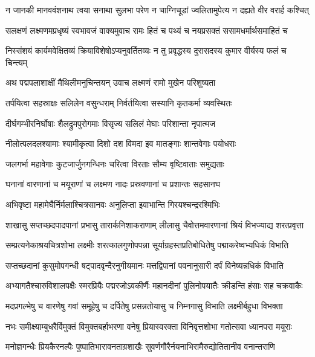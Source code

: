 \twolineshloka
{न जानकी मानववंशनाथ त्वया सनाथा सुलभा परेण}
{न चाग्निचूडां ज्वलितामुपेत्य न दह्यते वीर वरार्ह कश्चित्} %

\twolineshloka
{सलक्षणं लक्ष्मणमप्रधृष्यं स्वभावजं वाक्यमुवाच रामः}
{हितं च पथ्यं च नयप्रसक्तं ससामधर्मार्थसमाहितं च} %

\twolineshloka
{निस्संशयं कार्यमवेक्षितव्यं क्रियाविशेषोऽप्यनुवर्तितव्यः}
{न तु प्रवृद्धस्य दुरासदस्य कुमार वीर्यस्य फलं च चिन्त्यम्} %

\twolineshloka
{अथ पद्मपलाशाक्षीं मैथिलीमनुचिन्तयन्}
{उवाच लक्ष्मणं रामो मुखेन परिशुष्यता} %

\twolineshloka
{तर्पयित्वा सहस्राक्षः सलिलेन वसुन्धराम्}
{निर्वर्तयित्वा सस्यानि कृतकर्मा व्यवस्थितः} %

\twolineshloka
{दीर्घगम्भीरनिर्घोषाः शैलद्रुमपुरोगमाः}
{विसृज्य सलिलं मेघाः परिशान्ता नृपात्मज} %

\twolineshloka
{नीलोत्पलदलश्यामाः श्यामीकृत्वा दिशो दश}
{विमदा इव मातङ्गाः शान्तवेगाः पयोधराः} %

\twolineshloka
{जलगर्भा महावेगाः कुटजार्जुनगन्धिनः}
{चरित्वा विरताः सौम्य वृष्टिवाताः समुद्यताः} %

\twolineshloka
{घनानां वारणानां च मयूराणां च लक्ष्मण}
{नादः प्रस्रवणानां च प्रशान्तः सहसानघ} %

\twolineshloka
{अभिवृष्टा महामेघैर्निर्मलाश्चित्रसानवः}
{अनुलिप्ता इवाभान्ति गिरयश्चन्द्ररश्मिभिः} %

\twolineshloka
{शाखासु सप्तच्छदपादपानां प्रभासु तारार्कनिशाकराणाम्}
{लीलासु चैवोत्तमवारणानां श्रियं विभज्याद्य शरत्प्रवृत्ता} %

\twolineshloka
{सम्प्रत्यनेकाश्रयचित्रशोभा लक्ष्मीः शरत्कालगुणोपपन्ना}
{सूर्याग्रहस्तप्रतिबोधितेषु पद्माकरेष्वभ्यधिकं विभाति} %

\twolineshloka
{सप्तच्छदानां कुसुमोपगन्धी षट्पादवृन्दैरनुगीयमानः}
{मत्तद्विपानां पवनानुसारी दर्पं विनेष्यन्नधिकं विभाति} %

\twolineshloka
{अभ्यागतैश्चारुविशालपक्षैः स्मरप्रियैः पद्मरजोऽवकीर्णैः}
{महानदीनां पुलिनोपयातैः क्रीडन्ति हंसाः सह चक्रवाकैः} %

\twolineshloka
{मदप्रगल्भेषु च वारणेषु गवां समूहेषु च दर्पितेषु}
{प्रसन्नतोयासु च निम्नगासु विभाति लक्ष्मीर्बहुधा विभक्ता} %

\twolineshloka
{नभः समीक्ष्याम्बुधरैर्विमुक्तं विमुक्तबर्हाभरणा वनेषु}
{प्रियास्वरक्ता विनिवृत्तशोभा गतोत्सवा ध्यानपरा मयूराः} %

\twolineshloka
{मनोज्ञगन्धैः प्रियकैरनल्पैः पुष्पातिभारावनताग्रशाखैः}
{सुवर्णगौरैर्नयनाभिरामैरुद्योतितानीव वनान्तराणि} %

